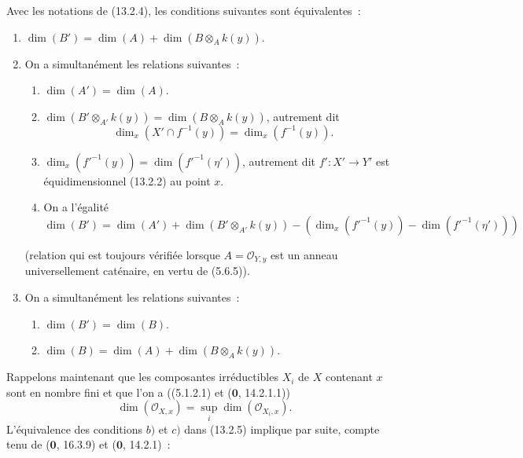 \begin{lemma}[13.2.5]
\label{IV.13.2.5-fr}
Avec les notations de (13.2.4), les conditions suivantes sont équivalentes~:
\begin{enumerate}[label=\emph{\alph*)}]
  \item $\dim(B')=\dim(A)+\dim(B\otimes_Ak(y))$.
  \item On a simultanément les relations suivantes~:
  \begin{enumerate}[label=(\roman*)]
    \item $\dim(A')=\dim(A)$.
    \item $\dim(B'\otimes_{A'}k(y))=\dim(B\otimes_Ak(y))$, autrement dit
    \[
      \dim_x(X'\cap f^{-1}(y))=\dim_x(f^{-1}(y)).
    \]
    \item $\dim_x(f'^{-1}(y))=\dim(f'^{-1}(\eta'))$, autrement dit
    $f':X'\to Y'$ est équidimensionnel (13.2.2) au point $x$.
    \item On a l'égalité
    \[
      \dim(B')=\dim(A')+\dim(B'\otimes_{A'}k(y))
      -(\dim_x(f'^{-1}(y))-\dim(f'^{-1}(\eta')))
    \]
  \end{enumerate}
  (relation qui est toujours vérifiée lorsque $A=\mathcal O_{Y,y}$ est un
  anneau universellement caténaire, en vertu de (5.6.5)).
  \item On a simultanément les relations suivantes~:
  \begin{enumerate}[label=(\roman*)]
    \item $\dim(B')=\dim(B)$.
    \item $\dim(B)=\dim(A)+\dim(B\otimes_Ak(y))$.
  \end{enumerate}
\end{enumerate}
\end{lemma}

\begin{env}[13.2.6]
\label{IV.13.2.6-fr}
Rappelons maintenant que les composantes irréductibles $X_i$ de $X$ contenant
$x$ sont en nombre fini et que l'on a ((5.1.2.1) et ($\mathbf 0$, 14.2.1.1))
\[
\tag{13.2.6.1}
\label{IV.13.2.6.1-fr}
  \dim(\mathcal O_{X,x})=\sup_i\dim(\mathcal O_{X_i,x}).
\]
L'équivalence des conditions $b)$ et $c)$ dans (13.2.5) implique par suite,
compte tenu de ($\mathbf 0$, 16.3.9) et ($\mathbf 0$, 14.2.1)~:
\end{env}

